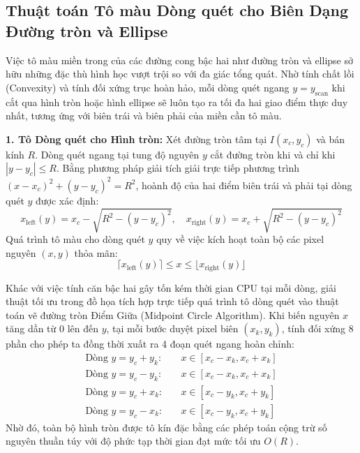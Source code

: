 \subsection{Thuật toán Tô màu Dòng quét cho Biên Dạng Đường tròn và Ellipse}
\label{subsec:scanline_circle_ellipse}

Việc tô màu miền trong của các đường cong bậc hai như đường tròn và ellipse sở hữu những đặc thù hình học vượt trội so với đa giác tổng quát. Nhờ tính chất lồi (Convexity) và tính đối xứng trục hoàn hảo, mỗi dòng quét ngang $y = y_{\text{scan}}$ khi cắt qua hình tròn hoặc hình ellipse sẽ luôn tạo ra tối đa hai giao điểm thực duy nhất, tương ứng với biên trái và biên phải của miền cần tô màu.

\textbf{1. Tô Dòng quét cho Hình tròn:}
Xét đường tròn tâm tại $I(x_c, y_c)$ và bán kính $R$. Dòng quét ngang tại tung độ nguyên $y$ cắt đường tròn khi và chỉ khi $|y - y_c| \le R$. Bằng phương pháp giải tích giải trực tiếp phương trình $(x - x_c)^2 + (y - y_c)^2 = R^2$, hoành độ của hai điểm biên trái và phải tại dòng quét $y$ được xác định:
\begin{equation}
\label{eq:circle_scanline_span}
x_{\text{left}}(y) = x_c - \sqrt{R^2 - (y - y_c)^2}, \quad x_{\text{right}}(y) = x_c + \sqrt{R^2 - (y - y_c)^2}
\end{equation}
Quá trình tô màu cho dòng quét $y$ quy về việc kích hoạt toàn bộ các pixel nguyên $(x, y)$ thỏa mãn:
\begin{equation}
\lceil x_{\text{left}}(y) \rceil \le x \le \lfloor x_{\text{right}}(y) \rfloor
\end{equation}

Khác với việc tính căn bậc hai gây tốn kém thời gian CPU tại mỗi dòng, giải thuật tối ưu trong đồ họa tích hợp trực tiếp quá trình tô dòng quét vào thuật toán vẽ đường tròn Điểm Giữa (Midpoint Circle Algorithm). Khi biến nguyên $x$ tăng dần từ $0$ lên đến $y$, tại mỗi bước duyệt pixel biên $(x_k, y_k)$, tính đối xứng 8 phần cho phép ta đồng thời xuất ra 4 đoạn quét ngang hoàn chỉnh:
\begin{align}
\text{Dòng } y = y_c + y_k: & \quad x \in [x_c - x_k, x_c + x_k] \\
\text{Dòng } y = y_c - y_k: & \quad x \in [x_c - x_k, x_c + x_k] \\
\text{Dòng } y = y_c + x_k: & \quad x \in [x_c - y_k, x_c + y_k] \\
\text{Dòng } y = y_c - x_k: & \quad x \in [x_c - y_k, x_c + y_k]
\end{align}
Nhờ đó, toàn bộ hình tròn được tô kín đặc bằng các phép toán cộng trừ số nguyên thuần túy với độ phức tạp thời gian đạt mức tối ưu $O(R)$.

